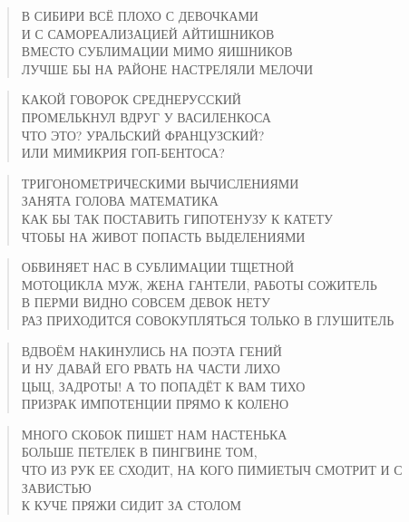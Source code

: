 \poemtitle{***}
\begin{verse}
В СИБИРИ ВСЁ ПЛОХО С ДЕВОЧКАМИ\\
И С САМОРЕАЛИЗАЦИЕЙ АЙТИШНИКОВ\\
ВМЕСТО СУБЛИМАЦИИ МИМО ЯИШНИКОВ\\
ЛУЧШЕ БЫ НА РАЙОНЕ НАСТРЕЛЯЛИ МЕЛОЧИ
\end{verse}

\poemtitle{***}
\begin{verse}
КАКОЙ ГОВОРОК СРЕДНЕРУССКИЙ\\
ПРОМЕЛЬКНУЛ ВДРУГ У ВАСИЛЕНКОСА\\
ЧТО ЭТО? УРАЛЬСКИЙ ФРАНЦУЗСКИЙ?\\
ИЛИ МИМИКРИЯ ГОП-БЕНТОСА?
\end{verse}

\poemtitle{***}
\begin{verse}
ТРИГОНОМЕТРИЧЕСКИМИ ВЫЧИСЛЕНИЯМИ\\
ЗАНЯТА ГОЛОВА МАТЕМАТИКА\\
КАК БЫ ТАК ПОСТАВИТЬ ГИПОТЕНУЗУ К КАТЕТУ\\
ЧТОБЫ НА ЖИВОТ ПОПАСТЬ ВЫДЕЛЕНИЯМИ
\end{verse}

\poemtitle{***}
\begin{verse}
ОБВИНЯЕТ НАС В СУБЛИМАЦИИ ТЩЕТНОЙ\\
МОТОЦИКЛА МУЖ, ЖЕНА ГАНТЕЛИ, РАБОТЫ СОЖИТЕЛЬ\\
В ПЕРМИ ВИДНО СОВСЕМ ДЕВОК НЕТУ\\
РАЗ ПРИХОДИТСЯ СОВОКУПЛЯТЬСЯ ТОЛЬКО В ГЛУШИТЕЛЬ
\end{verse}

\poemtitle{***}
\begin{verse}
ВДВОЁМ НАКИНУЛИСЬ НА ПОЭТА ГЕНИЙ\\
И НУ ДАВАЙ ЕГО РВАТЬ НА ЧАСТИ ЛИХО\\
ЦЫЦ, ЗАДРОТЫ! А ТО ПОПАДЁТ К ВАМ ТИХО\\
ПРИЗРАК ИМПОТЕНЦИИ ПРЯМО К КОЛЕНО
\end{verse}

\poemtitle{***}
\begin{verse}
МНОГО СКОБОК ПИШЕТ НАМ НАСТЕНЬКА\\
БОЛЬШЕ ПЕТЕЛЕК В ПИНГВИНЕ ТОМ,\\
ЧТО ИЗ РУК ЕЕ СХОДИТ, НА КОГО ПИМИЕТЫЧ СМОТРИТ И С ЗАВИСТЬЮ\\
К КУЧЕ ПРЯЖИ СИДИТ ЗА СТОЛОМ
\end{verse}

